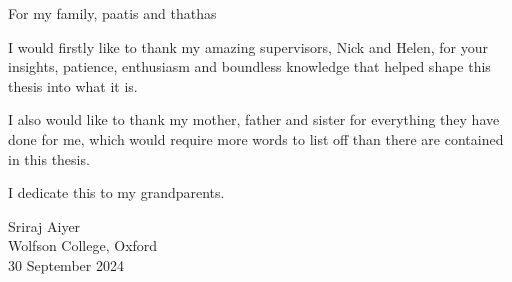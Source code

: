 \documentclass[a4paper, nobind]{templates/ociamthesis}
\begin{document}
\setcounter{secnumdepth}{2}
\setcounter{tocdepth}{1}



\begin{romanpages}

\maketitle

\begin{dedication}
  For my family, paatis and thathas
\end{dedication}



\begin{acknowledgements}
 	I would firstly like to thank my amazing supervisors, Nick and Helen, for your insights, patience, enthusiasm and boundless knowledge that helped shape this thesis into what it is.

 I also would like to thank my mother, father and sister for everything they have done for me, which would require more words to list off than there are contained in this thesis.

 I dedicate this to my grandparents.

 \begin{flushright}
 Sriraj Aiyer\\
 Wolfson College, Oxford \\
 30 September 2024
 \end{flushright}
\end{acknowledgements}






\end{romanpages}
\end{document}
